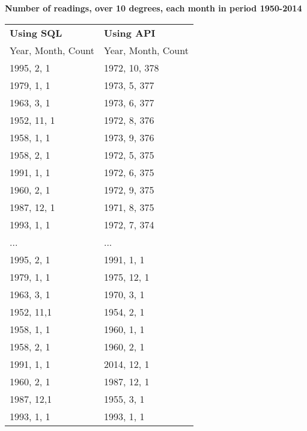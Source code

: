\documentclass[a4paper,titlepage,12pt]{article}
\begin{document}
\textbf{Number of readings, over 10 degrees, each month in period 1950-2014}
\begin{tabular}{l | l}
  \bf Using SQL & \bf Using API \\ 
  Year, Month, Count & Year, Month, Count \\
  \hline
  1995, 2,  1 & 1972, 10, 378 \\ 
  1979, 1,  1 & 1973, 5,  377 \\ 
  1963, 3,  1 & 1973, 6,  377 \\
  1952, 11, 1 & 1972, 8,  376 \\
  1958, 1,  1 & 1973, 9,  376 \\
  1958, 2,  1 & 1972, 5,  375 \\
  1991, 1,  1 & 1972, 6,  375 \\
  1960, 2,  1 & 1972, 9,  375 \\
  1987, 12, 1 & 1971, 8,  375 \\
  1993, 1,  1 & 1972, 7,  374 \\
  ... & ... \\ 
  1995, 2, 1 & 1991, 1,  1  \\
  1979, 1, 1 & 1975, 12, 1  \\
  1963, 3, 1 & 1970, 3,  1  \\
  1952, 11,1 & 1954, 2,  1  \\
  1958, 1, 1 & 1960, 1,  1  \\
  1958, 2, 1 & 1960, 2,  1  \\
  1991, 1, 1 & 2014, 12, 1  \\
  1960, 2, 1 & 1987, 12, 1  \\
  1987, 12,1 & 1955, 3,  1  \\
  1993, 1, 1 & 1993, 1,  1  \\
\end{tabular}
\end{document}

